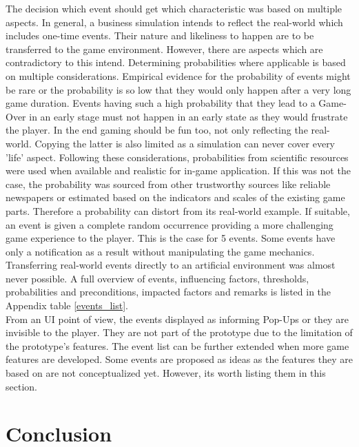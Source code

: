 \documentclass[11pt,titlepage,oneside,openany]{book}
\begin{document}
The decision which event should get which characteristic was based on multiple aspects. In general, a business simulation intends to reflect the real-world which includes one-time events. Their nature and likeliness to happen are to be transferred to the game environment. However, there are aspects which are contradictory to this intend.
Determining probabilities where applicable is based on multiple considerations. Empirical evidence for the probability of events might be rare or the probability is so low that they would only happen after a very long game duration. Events having such a high probability that they lead to a Game-Over in an early stage must not happen in an early state as they would frustrate the player. In the end gaming should be fun too, not only reflecting the real-world. Copying the latter is also limited as a simulation can never cover every 'life' aspect.  Following these considerations, probabilities from scientific resources were used when available and realistic for in-game application. If this was not the case, the probability was sourced from other trustworthy sources like reliable newspapers or estimated based on the indicators and scales of the existing game parts. Therefore a probability can distort from its real-world example. If suitable, an event is given a complete random occurrence providing a more challenging game experience to the player. This is the case for 5 events. Some events have only a notification as a result without manipulating the game mechanics. Transferring real-world events directly to an artificial environment was almost never possible. A full overview of events, influencing factors, thresholds, probabilities and preconditions, impacted factors and remarks is listed in the Appendix table \ref{events_list}. \\
From an UI point of view, the events displayed as informing Pop-Ups or they are invisible to the player. They are not part of the prototype due to the limitation of the prototype's features. The event list can be further extended when more game features are developed. Some events are proposed as ideas as the features they are based on are not conceptualized yet. However, its worth listing them in this section. 

\pagebreak




\chapter{Conclusion}
\end{document}

